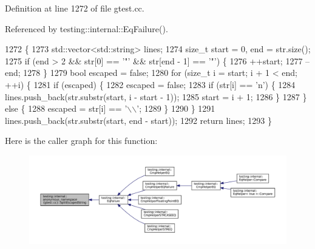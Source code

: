 Definition at line 1272 of file gtest.\+cc.



Referenced by testing\+::internal\+::\+Eq\+Failure().


\begin{DoxyCode}
1272                                                               \{
1273   std::vector<std::string> lines;
1274   \textcolor{keywordtype}{size\_t} start = 0, end = str.size();
1275   \textcolor{keywordflow}{if} (end > 2 && str[0] == \textcolor{charliteral}{'"'} && str[end - 1] == \textcolor{charliteral}{'"'}) \{
1276     ++start;
1277     --end;
1278   \}
1279   \textcolor{keywordtype}{bool} escaped = \textcolor{keyword}{false};
1280   \textcolor{keywordflow}{for} (\textcolor{keywordtype}{size\_t} i = start; i + 1 < end; ++i) \{
1281     \textcolor{keywordflow}{if} (escaped) \{
1282       escaped = \textcolor{keyword}{false};
1283       \textcolor{keywordflow}{if} (str[i] == \textcolor{charliteral}{'n'}) \{
1284         lines.push\_back(str.substr(start, i - start - 1));
1285         start = i + 1;
1286       \}
1287     \} \textcolor{keywordflow}{else} \{
1288       escaped = str[i] == \textcolor{charliteral}{'\(\backslash\)\(\backslash\)'};
1289     \}
1290   \}
1291   lines.push\_back(str.substr(start, end - start));
1292   \textcolor{keywordflow}{return} lines;
1293 \}
\end{DoxyCode}
Here is the caller graph for this function\+:
\nopagebreak
\begin{figure}[H]
\begin{center}
\leavevmode
\includegraphics[width=350pt]{namespacetesting_1_1internal_1_1anonymous__namespace_02gtest_8cc_03_a87e3d38ad422ce7018c6fcd4d1f3a938_icgraph}
\end{center}
\end{figure}
